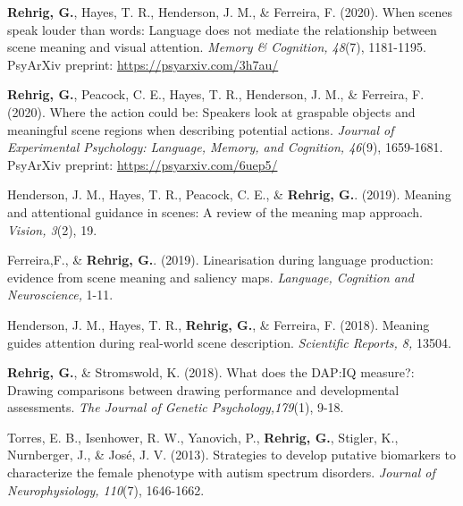 \textbf{Rehrig, G.}, Hayes, T. R., Henderson, J. M., \& Ferreira, F. (2020). When scenes speak louder than words: Language does not mediate the relationship between scene meaning and visual attention. \textit{Memory \& Cognition, 48}(7), 1181-1195. PsyArXiv preprint: \url{https://psyarxiv.com/3h7au/}

\textbf{Rehrig, G.}, Peacock, C. E., Hayes, T. R., Henderson, J. M., \& Ferreira, F. (2020). Where the action could be: Speakers look at graspable objects and meaningful scene regions when describing potential actions. \textit{Journal of Experimental Psychology: Language, Memory, and Cognition, 46}(9), 1659-1681. PsyArXiv preprint: \url{https://psyarxiv.com/6uep5/}

Henderson, J. M., Hayes, T. R., Peacock, C. E., \& \textbf{Rehrig, G.}. (2019). Meaning and attentional guidance in scenes: A review of the meaning map approach. \textit{Vision, 3}(2), 19.


Ferreira,F., \& \textbf{Rehrig, G.}. (2019). Linearisation during language production: evidence from scene meaning and saliency maps. \textit{Language, Cognition and Neuroscience,} 1-11.


Henderson, J. M., Hayes, T. R., \textbf{Rehrig, G.}, \& Ferreira, F. (2018). Meaning guides attention during real-world scene description. \textit{Scientific Reports, 8,} 13504. 


\textbf{Rehrig, G.}, \& Stromswold, K. (2018). What does the DAP:IQ measure?: Drawing comparisons between drawing performance and developmental assessments. \textit{The Journal of Genetic Psychology,179}(1), 9-18.


Torres, E. B., Isenhower, R. W., Yanovich, P., \textbf{Rehrig, G.}, Stigler, K., Nurnberger, J., \& Jos\'e, J. V. (2013). Strategies to develop putative biomarkers to characterize the female phenotype with autism spectrum disorders. \textit{Journal of Neurophysiology, 110}(7), 1646-1662.



